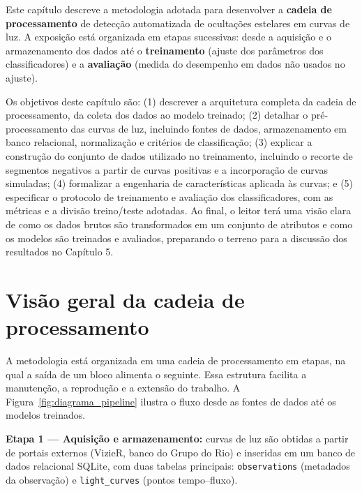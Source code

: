 
Este capítulo descreve a metodologia adotada para desenvolver a \textbf{cadeia de processamento} de detecção automatizada de ocultações estelares em curvas de luz. A exposição está organizada em etapas sucessivas: desde a aquisição e o armazenamento dos dados até o \textbf{treinamento} (ajuste dos parâmetros dos classificadores) e a \textbf{avaliação} (medida do desempenho em dados não usados no ajuste). 

Os objetivos deste capítulo são: (1) descrever a arquitetura completa da cadeia de processamento, da coleta dos dados ao modelo treinado; (2) detalhar o pré-processamento das curvas de luz, incluindo fontes de dados, armazenamento em banco relacional, normalização e critérios de classificação; (3) explicar a construção do conjunto de dados utilizado no treinamento, incluindo o recorte de segmentos negativos a partir de curvas positivas e a incorporação de curvas simuladas; (4) formalizar a engenharia de características aplicada às curvas; e (5) especificar o protocolo de treinamento e avaliação dos classificadores, com as métricas e a divisão treino/teste adotadas. Ao final, o leitor terá uma visão clara de como os dados brutos são transformados em um conjunto de atributos e como os modelos são treinados e avaliados, preparando o terreno para a discussão dos resultados no Capítulo 5.

\section{Visão geral da cadeia de processamento}
\label{sec:visao_geral}

A metodologia está organizada em uma cadeia de processamento em etapas, na qual a saída de um bloco alimenta o seguinte. Essa estrutura facilita a manutenção, a reprodução e a extensão do trabalho. A Figura~\ref{fig:diagrama_pipeline} ilustra o fluxo desde as fontes de dados até os modelos treinados.

\textbf{Etapa 1 --- Aquisição e armazenamento:} curvas de luz são obtidas a partir de portais externos (VizieR, banco do Grupo do Rio) e inseridas em um banco de dados relacional SQLite, com duas tabelas principais: \texttt{observations} (metadados da observação) e \texttt{light\_curves} (pontos tempo--fluxo).

